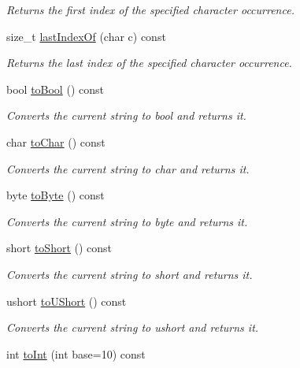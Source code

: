 \begin{DoxyCompactItemize}
\begin{DoxyCompactList}\small\item\em Returns the first index of the specified character occurrence. \end{DoxyCompactList}\item 
size\+\_\+t \mbox{\hyperlink{class_a_string_a11458abb719f576874995cc1a1e06078}{last\+Index\+Of}} (char c) const
\begin{DoxyCompactList}\small\item\em Returns the last index of the specified character occurrence. \end{DoxyCompactList}\item 
bool \mbox{\hyperlink{class_a_string_addea3a08682e1875b48d679f30f539cb}{to\+Bool}} () const
\begin{DoxyCompactList}\small\item\em Converts the current string to bool and returns it. \end{DoxyCompactList}\item 
char \mbox{\hyperlink{class_a_string_a6cb34c26433abd7e75e0bdf9bb40ccba}{to\+Char}} () const
\begin{DoxyCompactList}\small\item\em Converts the current string to char and returns it. \end{DoxyCompactList}\item 
byte \mbox{\hyperlink{class_a_string_a67f811fea214d958fe296fef79776bc1}{to\+Byte}} () const
\begin{DoxyCompactList}\small\item\em Converts the current string to byte and returns it. \end{DoxyCompactList}\item 
short \mbox{\hyperlink{class_a_string_a57ad542374eaadedfd9bcc4789887d79}{to\+Short}} () const
\begin{DoxyCompactList}\small\item\em Converts the current string to short and returns it. \end{DoxyCompactList}\item 
ushort \mbox{\hyperlink{class_a_string_a4540c5503000d2f399617920055de7a4}{to\+U\+Short}} () const
\begin{DoxyCompactList}\small\item\em Converts the current string to ushort and returns it. \end{DoxyCompactList}\item 
int \mbox{\hyperlink{class_a_string_a037e4cedecdb1d68614cf3f199f85834}{to\+Int}} (int base=10) const

\end{DoxyCompactItemize}
